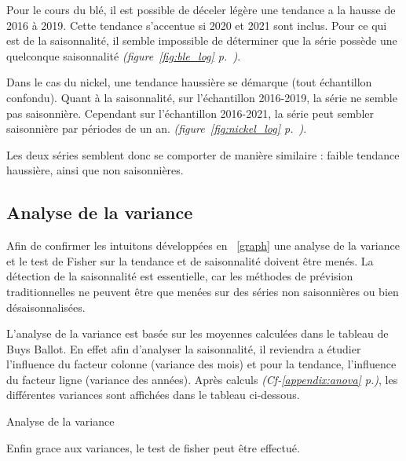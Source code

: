 Pour le cours du blé, il est possible de déceler légère une tendance a la hausse de 2016 à 2019. Cette tendance s'accentue si 2020 et 2021 
sont inclus. Pour ce qui est de la saisonnalité, il semble impossible de déterminer que la série possède une quelconque saisonnalité
\textit{(figure~\ref{fig:ble_log} p.~\pageref{fig:ble_log})}.

Dans le cas du nickel, une tendance haussière se démarque (tout échantillon confondu). Quant à la saisonnalité, sur l'échantillon 2016-2019, 
la série ne semble pas saisonnière. Cependant sur l'échantillon 2016-2021, la série peut sembler saisonnière par périodes de un an.
\textit{(figure~\ref{fig:nickel_log} p.~\pageref{fig:nickel_log})}.

Les deux séries semblent donc se comporter de manière similaire : faible tendance haussière, ainsi que non saisonnières. 

\subsection{Analyse de la variance}
Afin de confirmer les intuitons développées en ~\ref{graph} une analyse de la variance et le test de Fisher sur la tendance et de 
saisonnalité doivent être menés. La détection de la saisonnalité est essentielle, car les méthodes de prévision traditionnelles
ne peuvent être que menées sur des séries non saisonnières ou bien désaisonnalisées.

L'analyse de la variance est basée sur les moyennes calculées dans le tableau de Buys Ballot. En effet afin d'analyser la saisonnalité, 
il reviendra a étudier l'influence du facteur colonne (variance des mois) et pour la tendance, l'influence du facteur ligne (variance des années).
Après calculs \textit{(Cf-\ref{appendix:anova} p.\pageref{appendix:anova})}, les différentes variances sont affichées dans le tableau ci-dessous.

\begin{table}[H]
    \centering
    \caption{Analyse de la variance}
    \sffamily
    
\end{table}

Enfin grace aux variances, le test de fisher peut être effectué.

